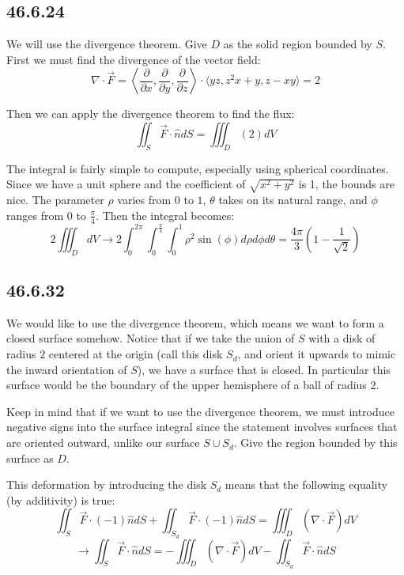 \documentclass{article}
\begin{document}
\subsection{46.6.24}

We will use the divergence theorem. Give $D$ as the solid region bounded by $S$. First we must find the divergence of the vector field:
$$\nabla\cdot\vec{F} = \left\langle \frac{\partial}{\partial x}, \frac{\partial}{\partial y} ,\frac{\partial}{\partial z} \right\rangle \cdot \langle yz, z^2x+y, z-xy \rangle= 2$$

Then we can apply the divergence theorem to find the flux:
$$\iint_S \vec{F}\cdot \hat{n}dS = \iiint_D (2)dV$$

The integral is fairly simple to compute, especially using spherical coordinates. Since we have a unit sphere and the coefficient of $\sqrt{x^2+y^2}$ is 1, the bounds are nice. The parameter $\rho$ varies from $0$ to $1$, $\theta$ takes on its natural range, and $\phi$ ranges from $0$ to $\frac{\pi}{4}$. Then the integral becomes:
$$2\iiint_D dV \to 2\int_0^{2\pi}\int_0^{\frac{\pi}{4}}\int_0^1 \rho^2\sin(\phi)d\rho d\phi d\theta = \frac{4\pi}{3}\left(1-\frac{1}{\sqrt{2}}\right)$$

\subsection{46.6.32}

We would like to use the divergence theorem, which means we want to form a closed surface somehow. Notice that if we take the union of $S$ with a disk of radius $2$ centered at the origin (call this disk $S_d$, and orient it upwards to mimic the inward orientation of $S$), we have a surface that is closed. In particular this surface would be the boundary of the upper hemisphere of a ball of radius 2.

Keep in mind that if we want to use the divergence theorem, we must introduce negative signs into the surface integral since the statement involves surfaces that are oriented outward, unlike our surface $S\cup S_d$. Give the region bounded by this surface as $D$. 

This deformation by introducing the disk $S_d$ means that the following equality (by additivity) is true:
$$\iint_S \vec{F}\cdot (-1)\hat{n}dS + \iint_{S_d} \vec{F}\cdot (-1)\hat{n}dS = \iiint_D \left(\nabla \cdot \vec{F}\right) dV$$
$$\to \iint_S \vec{F}\cdot \hat{n}dS = -\iiint_D \left(\nabla \cdot \vec{F}\right) dV - \iint_{S_d} \vec{F}\cdot \hat{n}dS$$
\end{document}
